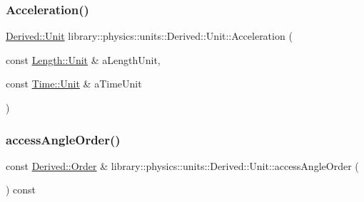 \subsubsection{\texorpdfstring{Acceleration()}{Acceleration()}}
{\footnotesize\ttfamily \hyperlink{classlibrary_1_1physics_1_1units_1_1_derived_1_1_unit}{Derived\+::\+Unit} library\+::physics\+::units\+::\+Derived\+::\+Unit\+::\+Acceleration (\begin{DoxyParamCaption}\item[{const \hyperlink{classlibrary_1_1physics_1_1units_1_1_length_a3b8b39cd245cf6b19dc34459baeccb18}{Length\+::\+Unit} \&}]{a\+Length\+Unit,  }\item[{const \hyperlink{classlibrary_1_1physics_1_1units_1_1_time_ab876a6a05c9a2f28905f2753bfd64109}{Time\+::\+Unit} \&}]{a\+Time\+Unit }\end{DoxyParamCaption})\hspace{0.3cm}{\ttfamily [static]}}

\mbox{\label{classlibrary_1_1physics_1_1units_1_1_derived_1_1_unit_ab0973ccd11a78a33bb9303a15d886a2c}} 
\subsubsection{\texorpdfstring{access\+Angle\+Order()}{accessAngleOrder()}}
{\footnotesize\ttfamily const \hyperlink{classlibrary_1_1physics_1_1units_1_1_derived_1_1_order}{Derived\+::\+Order} \& library\+::physics\+::units\+::\+Derived\+::\+Unit\+::access\+Angle\+Order (\begin{DoxyParamCaption}{ }\end{DoxyParamCaption}) const}

\mbox{\label{classlibrary_1_1physics_1_1units_1_1_derived_1_1_unit_a93a5bd04df667ae87e71cdbba9cb7a9a}} 
